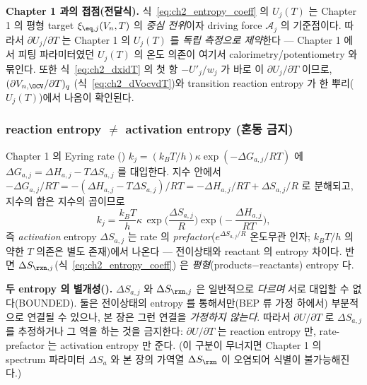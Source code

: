 \begin{linkbox}
\textbf{Chapter 1 과의 접점(전달식).} 식~\eqref{eq:ch2_entropy_coeff} 의 $U_j(T)$ 는 Chapter 1 의 평형
target $\xi_{\eq,j}(V_n,T)$ 의 \emph{중심 전위}이자 driving force $\mathcal A_j$ 의 기준점이다. 따라서
$\partial U_j/\partial T$ 는 Chapter 1 의 $U_j(T)$ 를 \emph{독립 측정으로 제약}한다 — Chapter 1 에서 피팅
파라미터였던 $U_j(T)$ 의 온도 의존이 여기서 calorimetry/potentiometry 와 묶인다. 또한 식~\eqref{eq:ch2_dxidT}
의 첫 항 $-U'_j/w_j$ 가 바로 이 $\partial U_j/\partial T$ 이므로, $(\partial V_{n,\OCV}/\partial T)_q$
(식~\eqref{eq:ch2_dVocvdT})와 transition reaction entropy 가 한 뿌리($U_j(T)$)에서 나옴이 확인된다.
\end{linkbox}

\subsubsection{reaction entropy $\ne$ activation entropy (혼동 금지)}\label{sec:ch2_two_entropy}
Chapter 1 의 Eyring rate \cite{eyring1935}() $k_j=(k_BT/h)\kappa\exp(-\Delta G_{a,j}/RT)$ 에
$\Delta G_{a,j}=\Delta H_{a,j}-T\Delta S_{a,j}$ 를 대입한다. 지수 안에서 $-\Delta G_{a,j}/RT=
-(\Delta H_{a,j}-T\Delta S_{a,j})/RT=-\Delta H_{a,j}/RT+\Delta S_{a,j}/R$ 로 분해되고, 지수의 합은 지수의
곱이므로
\begin{equation}
k_j=\frac{k_BT}{h}\kappa\,\exp\!\Big(\frac{\Delta S_{a,j}}{R}\Big)\exp\!\Big(-\frac{\Delta H_{a,j}}{RT}\Big),
\label{eq:ch2_eyring_entropy}
\end{equation}
즉 \emph{activation} entropy $\Delta S_{a,j}$ 는 rate 의 \emph{prefactor}($e^{\Delta S_{a,j}/R}$ 온도무관 인자;
$k_BT/h$ 의 약한 $T$ 의존은 별도 존재)에서 나온다 — 전이상태와 reactant 의 entropy 차이다. 반면 $\Delta S_{\rxn,j}$(식~\eqref{eq:ch2_entropy_coeff})
은 \emph{평형}(products$-$reactants) entropy 다.
\begin{boundbox}
\textbf{두 entropy 의 별개성().} $\Delta S_{a,j}$ 와 $\Delta S_{\rxn,j}$ 은 일반적으로 \emph{다르며}
서로 대입할 수 없다(BOUNDED). 둘은 전이상태의 entropy 를 통해서만(BEP 류 가정 하에서) 부분적으로 연결될 수
있으나, 본 장은 그런 연결을 \emph{가정하지 않는다}. 따라서 $\partial U/\partial T$ 로 $\Delta S_{a,j}$ 를
추정하거나 그 역을 하는 것을 금지한다: $\partial U/\partial T$ 는 reaction entropy 만, rate-prefactor 는
activation entropy 만 준다. (이 구분이 무너지면 Chapter 1 의 spectrum 파라미터 $\Delta S_a$ 와 본 장의 가역열
$\Delta S_\rxn$ 이 오염되어 식별이 불가능해진다.)
\end{boundbox}


